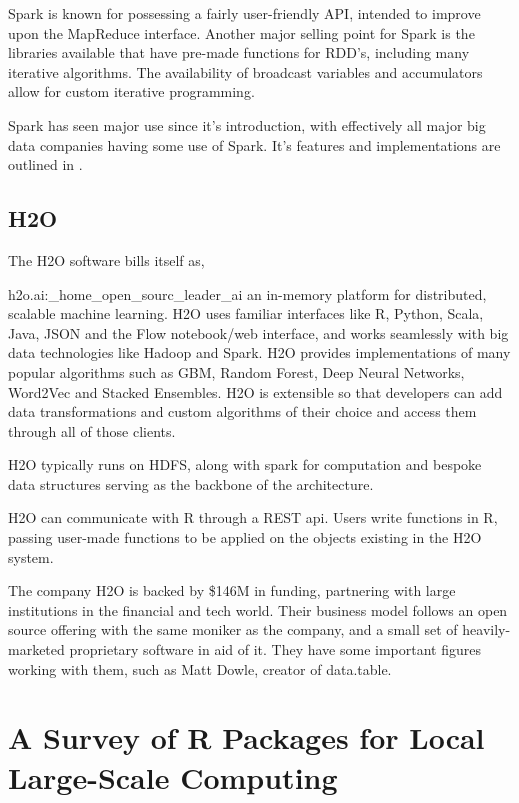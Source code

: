 \documentclass[a4paper,10pt]{article}
\begin{document}
Spark is known for possessing a fairly user-friendly API, intended to
improve upon the MapReduce interface. Another major selling point for
Spark is the libraries available that have pre-made functions for
RDD's, including many iterative algorithms. The availability of
broadcast variables and accumulators allow for custom iterative
programming.

Spark has seen major use since it's introduction, with effectively all
major big data companies having some use of Spark. It's features and
implementations are outlined in \textcite{zaharia2016apache}.

\subsection{H2O}
\label{sec:h2o}

The H2O software bills itself as,

\begin{displaycquote}{h2o.ai:_home_open_sourc_leader_ai}
	an in-memory platform for distributed, scalable machine learning.
	H2O uses familiar interfaces like R, Python, Scala, Java, JSON and
	the Flow notebook/web interface, and works seamlessly with big data
	technologies like Hadoop and Spark. H2O provides implementations of
	many popular algorithms such as GBM, Random Forest, Deep Neural
	Networks, Word2Vec and Stacked Ensembles. H2O is extensible so that
	developers can add data transformations and custom algorithms of
	their choice and access them through all of those clients.
\end{displaycquote}

H2O typically runs on HDFS, along with spark for computation and
bespoke data structures serving as the backbone of the architecture.

H2O can communicate with R through a REST api. Users write functions
in R, passing user-made functions to be applied on the objects
existing in the H2O system\cite{h2o.ai:_h2o}.

The company H2O is backed by \$146M in funding, partnering with large
institutions in the financial and tech world. Their business model
follows an open source offering with the same moniker as the company,
and a small set of heavily-marketed proprietary software in aid of it.
They have some important figures working with them, such as Matt
Dowle, creator of data.table.

\section{A Survey of R Packages for Local Large-Scale Computing}
\end{document}
